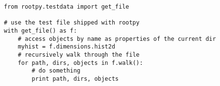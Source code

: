 \begin{footnotesize}
\begin{verbatim}
from rootpy.testdata import get_file

# use the test file shipped with rootpy
with get_file() as f:
    # access objects by name as properties of the current dir
    myhist = f.dimensions.hist2d
    # recursively walk through the file
    for path, dirs, objects in f.walk():
        # do something
        print path, dirs, objects
\end{verbatim}
\end{footnotesize}
